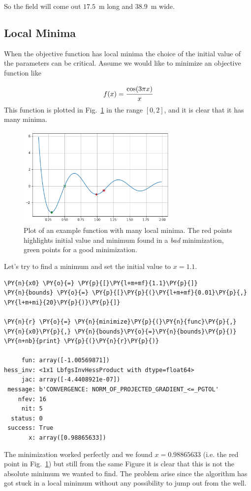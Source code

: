 So the field will come out \(17.5\)~m long and \(38.9\)~m wide.

\subsection{Local Minima}
When the objective function has local minima the choice of the initial value of the parameters can be critical. 
Assume we would like to minimize an objective function like 

\[
f(x) = \cfrac{\mathrm{cos}(3\pi x)}{x}
\]
This function is plotted in Fig.~\ref{fig:local_minima} in the range $[0, 2]$, and it is clear that it has many minima. 

\begin{figure}[htb]
	\centering
	\includegraphics[width=0.7\textwidth]{figures/local_minima.png}
	\caption{Plot of an example function with many local minima. The red points highlights initial value and minimum found in a \emph{bad} minimization, green points for a good minimization.}
	\label{fig:local_minima}
\end{figure}

Let's try to find a minimum and set the initial value to $x=1.1$.
\begin{codebox}
\begin{Verbatim}[commandchars=\\\{\}]
\PY{n}{x0} \PY{o}{=} \PY{p}{[}\PY{l+m+mf}{1.1}\PY{p}{]}
\PY{n}{bounds} \PY{o}{=} \PY{p}{[}\PY{p}{(}\PY{l+m+mf}{0.01}\PY{p}{,} \PY{l+m+mi}{20}\PY{p}{)}\PY{p}{]}
		
\PY{n}{r} \PY{o}{=} \PY{n}{minimize}\PY{p}{(}\PY{n}{func}\PY{p}{,} \PY{n}{x0}\PY{p}{,} \PY{n}{bounds}\PY{o}{=}\PY{n}{bounds}\PY{p}{)}
\PY{n+nb}{print} \PY{p}{(}\PY{n}{r}\PY{p}{)}

     fun: array([-1.00569871])
hess_inv: <1x1 LbfgsInvHessProduct with dtype=float64>
     jac: array([-4.4408921e-07])
 message: b'CONVERGENCE: NORM_OF_PROJECTED_GRADIENT_<=_PGTOL'
    nfev: 16
     nit: 5
  status: 0
 success: True
       x: array([0.98865633])
\end{Verbatim}
\end{codebox}
The minimization worked perfectly and we found $x=0.98865633$ (i.e. the red point in Fig.~\ref{fig:local_minima}) but still from the same Figure it is clear that this is not the absolute minimum we wanted to find. The problem arise since the algorithm has got stuck in a local minimum without any possibility to jump out from the well.

